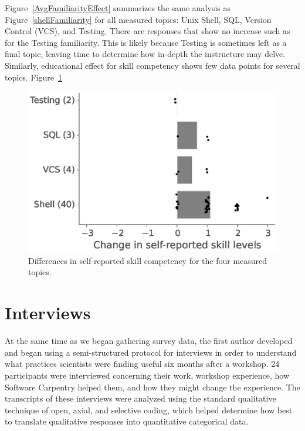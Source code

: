 \documentclass[10pt, twocolumn]{article}
\begin{document}
Figure~\ref{AvgFamiliarityEffect} summarizes the same analysis as Figure~\ref{shellFamiliarity}
for all measured topics: Unix Shell, SQL, Version Control (VCS), and Testing.
There are responses that show no increase such as for the Testing familiarity.
This is likely because Testing is sometimes left as a final topic,
leaving time to determine how in-depth the instructure may delve. 
Similarly, educational effect for skill competency
shows few data points for several topics. Figure~\ref{AvgSkillEffect}

\begin{figure}
\centering
\includegraphics[width=\linewidth]{AvgSkillEffect}
\caption{
    Differences in self-reported skill competency for the four measured topics.
\label{AvgSkillEffect}}

\end{figure}

\section{Interviews}

At the same time as we began gathering survey data,
the first author developed and began using a semi-structured protocol for interviews
in order to understand what practices scientists were finding useful six months after a workshop.
24 participants were interviewed concerning their work,
workshop experience,
how Software Carpentry helped them,
and how they might change the experience.
The transcripts of these interviews were analyzed
using the standard qualitative technique of open, axial, and selective coding,
which helped determine how best to translate qualitative responses into quantitative categorical data.
\end{document}
